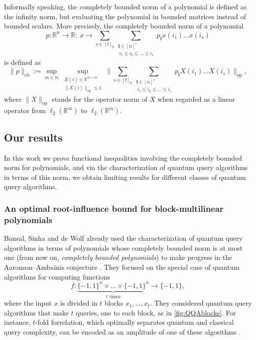 \documentclass[11pt]{article}
\DeclareMathOperator{\cb}{cb}
\DeclareMathOperator{\op}{op}
\newcommand{\norm}[1]{\|#1\|}
\newcommand{\R}{\mathbb{R}} %
\newcommand{\N}{\mathbb{N}} %
\newcommand{\1}{\mathbf{1}}
\newcommand{\ind}[1]{\mathbf{#1}}
\theoremstyle{plain}
\theoremstyle{definition}
\theoremstyle{remark}
\begin{document}
Informally speaking, the completely bounded norm of a polynomial is defined as the infinity norm, but evaluating the polynomial in bounded matrices instead of bounded scalars.  
More precisely, the completely bounded norm of a polynomial
$$p:\R^n\to \R:\ x\to\sum_{s\in [t]_0}\sum_{\substack{\ind i\in [n]^s\\\ i_1\leq i_2\leq \dots \leq i_s}} p_{\ind i}x(i_1)\dots x(i_s)$$
is defined as
\begin{equation}\label{eq:cbnorm}
    \norm{p}_{\cb}:=\sup_{m\in \N}\sup_{\substack{X(i)\in\R^{m\times m}\\ \norm{X(i)}_{\op}\leq 1}} \norm{ \sum_{s\in [t]_0}\sum_{\substack{\ind i\in [n]^s\\\ i_1\leq i_2\leq \dots \leq i_s}}p_{\ind i} X(i_1)\dots X(i_s)}_{\op},
\end{equation}
where  $\norm{X}_{\op}$ stands for the operator norm of $X$ when regarded as a linear operator from $\ell_2(\mathbb R^m)$ to $\ell_2(\mathbb R^m).$ 




\subsection{Our results} In this work we prove functional inequalities involving the completely bounded norm for polynomials, and via the characterization of quantum query algorithms in terms of this norm, we obtain limiting results for different classes of quantum query algorithms. 

\subsubsection{An optimal root-influence bound  for block-multilinear polynomials}

Bansal, Sinha and de Wolf already used the characterization of quantum query algorithms in terms of polynomials whose completely bounded norm is at most one (from now on, \emph{completely bounded polynomials}) to make progress in the Aaronson--Ambainis conjecture \cite{Bansal:2022}. They focused on the special case of quantum algorithms for computing functions $$f:\underbrace{\{-1,1\}^n\times\dots\times \{-1,1\}^n}_{t\text{ times}}\to\{-1,1\},$$
where the input $x$ is divided in $t$ blocks $x_1,\dots,x_t$. They considered quantum query algorithms that make $t$ queries, one to each block, as in \cref{fig:QQAblocks}. For instance, $t$-fold forrelation, which optimally separates quantum and classical query complexity, can be encoded as an amplitude of one of these algorithms \cite{aaronson2015forrelation}. 
\end{document}
